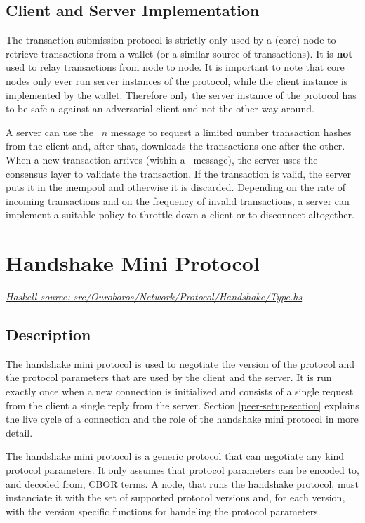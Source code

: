 \documentclass{report}
\newcommand{\hsref}[1]{\href{https://github.com/input-output-hk/ouroboros-network/blob/master/#1}{\emph{Haskell source: #1}}}
\newcommand{\state}[1]{\texttt{#1}}
\newcommand{\msg}[1]{\texttt{#1}}
\theoremstyle{definition}{
  \newtheorem{lemma}{Lemma}[section] %
  \newtheorem{definition}[lemma]{Definition}
}
\theoremstyle{theorem}{
  \newtheorem{invariant}[lemma]{Invariant}
  \newtheorem{proofobligation}[lemma]{Proof Obligation}
}
\numberwithin{equation}{lemma}
\begin{document}
\subsection{Client and Server Implementation}
The transaction submission protocol is strictly only used
by a (core) node to retrieve transactions from a wallet (or a similar source of transactions).
It is {\bf not} used to relay transactions from node to node.
It is important to note that core nodes only ever run server instances of the protocol,
while the client instance is implemented by the wallet.
Therefore only the server instance of the protocol has to be safe a against an adversarial client
and not the other way around.

A server can use the \GetHashes~$n$ message to request a limited number transaction hashes from the client
and, after that, downloads the transactions one after the other.
When a new transaction arrives (within a \Tx~message), the server uses the consensus layer to
validate the transaction.
If the transaction is valid, the server puts it in the mempool and otherwise it is discarded.
Depending on the rate of incoming transactions and on the frequency of invalid transactions,
a server can implement a suitable policy to throttle down a client or to disconnect altogether.


\section{Handshake Mini Protocol}
\hsref{src/Ouroboros/Network/Protocol/Handshake/Type.hs}
\label{handshake-protocol}
\newcommand{\Propose}{\state{Propose}}
\newcommand{\Confirm}{\state{Confirm}}
\newcommand{\ProposeVersions}{\msg{ProposeVersions}}
\newcommand{\AcceptVersion}{\msg{AcceptVersion}}
\newcommand{\Refuse}{\msg{Refuse}}

\subsection{Description}
The handshake mini protocol is used to negotiate the version of the protocol
and the protocol parameters that are used by the client and the server.
It is run exactly once when a new connection is initialized
and consists of a single request from the client a single reply from the server.
Section \ref{peer-setup-section} explains the live cycle of a connection and the role of
the handshake mini protocol in more detail.

The handshake mini protocol is a generic protocol that can negotiate any kind protocol parameters.
It only assumes that protocol parameters can be encoded to, and decoded from, CBOR terms.
A node, that runs the handshake protocol, must instanciate it with the set of
supported protocol versions and, for each version, with the version specific functions for
handeling the protocol parameters.
\end{document}
